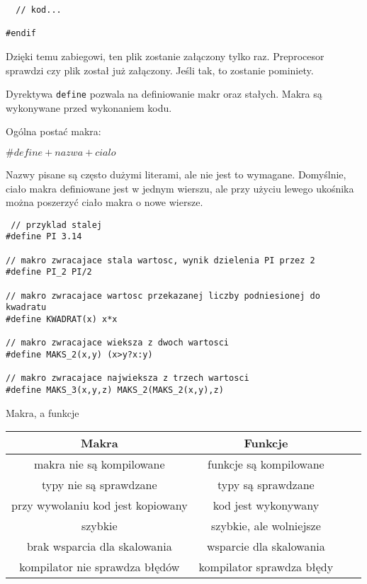\documentclass[notheorems, aspectratio=54]{beamer}
\begin{document}
\begin{frame}
\begin{frame}
\begin{lstlisting}
  // kod...

#endif
		\end{lstlisting}
				
		Dzięki temu zabiegowi, ten plik zostanie załączony tylko raz. Preprocesor sprawdzi czy plik został już załączony.
		Jeśli tak, to zostanie pominiety.
	\end{frame}
		
	\begin{frame}
		Dyrektywa \texttt{define} pozwala na definiowanie makr oraz stałych. 
		Makra są wykonywane przed wykonaniem kodu. 
				
		Ogólna postać makra:
				
		$\# define + nazwa + cialo$
				
		Nazwy pisane są często dużymi literami, ale nie jest to wymagane.
		Domyślnie, ciało makra definiowane jest w jednym wierszu, 
		ale przy użyciu lewego ukośnika można poszerzyć ciało makra o nowe wiersze.
				
		\begin{lstlisting}
 // przyklad stalej
#define PI 3.14

// makro zwracajace stala wartosc, wynik dzielenia PI przez 2
#define PI_2 PI/2

// makro zwracajace wartosc przekazanej liczby podniesionej do kwadratu
#define KWADRAT(x) x*x

// makro zwracajace wieksza z dwoch wartosci
#define MAKS_2(x,y) (x>y?x:y)

// makro zwracajace najwieksza z trzech wartosci
#define MAKS_3(x,y,z) MAKS_2(MAKS_2(x,y),z) 
		\end{lstlisting}
		
	\end{frame}
	
	\begin{frame}
		Makra, a funkcje
		
		\begin{center}
			\begin{tabular}{ |c|c|c|c| } 
				\hline
				Makra                             & Funkcje                     \\
				\hline
				makra nie są kompilowane         & funkcje są kompilowane     \\
				typy nie są sprawdzane           & typy są sprawdzane         \\
				przy wywolaniu kod jest kopiowany & kod jest wykonywany         \\
				szybkie                           & szybkie, ale wolniejsze     \\
				brak wsparcia dla skalowania      & wsparcie dla skalowania     \\
				kompilator nie sprawdza błędów & kompilator sprawdza błędy \\
				\hline
			\end{tabular}
		\end{center}
		

\end{frame}
\end{frame}
\end{document}
